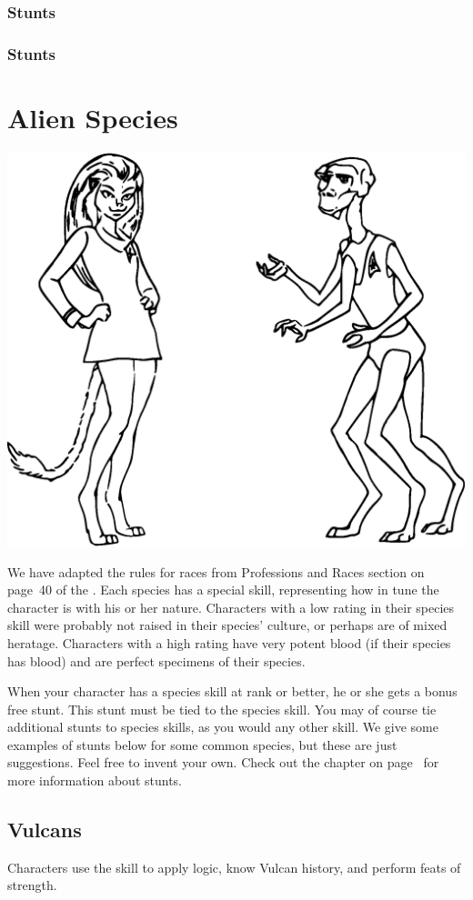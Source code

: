 \documentclass[12pt,titlepage,openany]{book}
\begin{document}
\subsection*{ Stunts}\label{subsec:presence-stunts}
\TBW

\subsection*{ Stunts}\label{subsec:survival-stunts}
\TBW



\chapter{Alien Species}\label{chap:species}

\begin{center}
    \includegraphics[width=0.4\linewidth]{img/AlienSpecies.eps}
\end{center}

\noindent
We have adapted the rules for races from Professions and Races section on
page~40 of the \FateSystemToolkit{}. Each species has a special skill,
representing how in tune the character is with his or her nature. Characters
with a low rating in their species skill were probably not raised in their
species' culture, or perhaps are of mixed heratage. Characters with a high
rating have very potent blood (if their species has blood) and are perfect
specimens of their species.

When your character has a species skill at rank  or better, he or
she gets a bonus free stunt. This stunt must be tied to the species skill. You
may of course tie additional stunts to species skills, as you would any other
skill. We give some examples of stunts below for some common species, but these
are just suggestions. Feel free to invent your own. Check out the
 chapter on page~\pageref{chap:stunts} for more
information about stunts.

\section{Vulcans}\label{sec:vulcans}
Characters use the  skill to apply logic, know Vulcan history,
and perform feats of strength.
\end{document}
